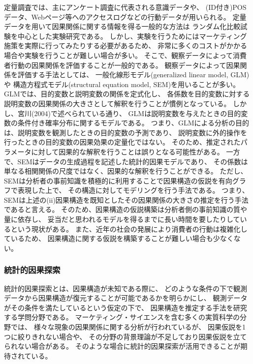 定量調査では、主にアンケート調査に代表される意識データや、
(ID付き)POSデータ、Webページ等へのアクセスログなどの行動データが用いられる。
定量データを用いて因果関係に関する情報を得る一般的な方法は
ランダム化比較試験を中心とした実験研究である。
しかし、実験を行うためにはマーケティング施策を実際に行ってみたりする必要があるため、
非常に多くのコストがかかる場合や実験を行うことが難しい場合が多い。
そこで、観察データによって消費者行動の因果関係を評価することが一般的である。
観察データによって因果関係を評価する手法としては、
一般化線形モデル(generalized linear model, GLM)や
構造方程式モデル(structural equation model, SEM)を用いることが多い\cite{2015-pb}\cite{2009-qw}。
GLMでは、目的変数と説明変数の関係を定式化し、
各係数を目的変数に対する説明変数の因果関係の大きさとして解釈を行うことが慣例となっている。
しかし、宮川(2004)\cite{2004-qj}で述べられている通り、
GLMは説明変数を与えたときの目的変数の条件付き確率分布に関するモデルである。
つまり、GLMによる分析の目的は、説明変数を観測したときの目的変数の予測であり、
説明変数に外的操作を行ったときの目的変数の因果効果の定量化ではない。
そのため、推定されたパラメータに対して因果的な解釈を行うことは誤りとなる可能性がある。
一方で、SEMはデータの生成過程を記述した統計的因果モデルであり、
その係数は単なる相関関係の尺度ではなく、因果的な解釈を行うことができる\cite{2004-qj}。
ただし、SEMは分析者の事前知識を積極的に利用することで因果構造の仮説を有向グラフで表現した上で、
その構造に対してモデリングを行う手法である。
つまり、SEMは上述の(ii)因果構造を既知としたその因果関係の大きさの推定を行う手法であると言える。
そのため、因果構造の仮説構築は分析者側の事前知識の質や量に依存し、
妥当だと思われるモデルを得るまでに長い時間を要したりしているという現状がある。
また、近年の社会の発展により消費者の行動は複雑化しているため、
因果構造に関する仮説を構築することが難しい場合も少なくない。


\subsubsection{統計的因果探索}

統計的因果探索とは、因果構造が未知である際に、
どのような条件の下で観測データから因果構造が復元することが可能であるかを明らかにし、
観測データがその条件を満たしているという仮定の下で、
因果構造を推定する手法を研究する学問分野である。
マーケティング・サイエンスを含む多くの実質科学の分野では、
様々な現象の因果関係に関する分析が行われているが、
因果仮説を1つに絞りきれない場合や、
その分野の背景理論が不足しており因果仮説を立てられない場合がある。
そのような場合に統計的因果探索が活用できることが期待されている\cite{2017-zx}。

